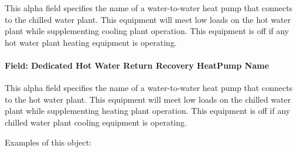 This alpha field specifies the name of a water-to-water heat pump that connects to the chilled water plant. This equipment will meet low loads on the hot water plant while supplementing cooling plant operation. This equipment is off if any hot water plant heating equipment is operating.

\paragraph{Field: Dedicated Hot Water Return Recovery HeatPump Name}\label{field-dedicated-hot-return-recovery-hp-name-plantequipmentoperationchillerheaterchangeover}

This alpha field specifies the name of a water-to-water heat pump that connects to the hot water plant. This equipment will meet low loads on the chilled water plant while supplementing heating plant operation. This equipment is off if any chilled water plant cooling equipment is operating.

Examples of this object:

